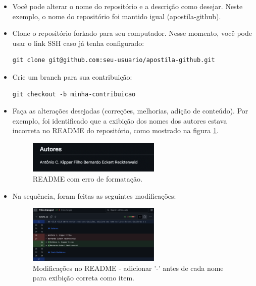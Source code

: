 \begin{itemize}
        \item Você pode alterar o nome do repositório e a descrição como desejar. Neste exemplo, o nome do repositório foi mantido igual (apostila-github).
        \item Clone o repositório forkado para seu computador. Nesse momento, você pode usar o link SSH caso já tenha configurado:
        \begin{lstlisting}[style=shellstyle]
git clone git@github.com:seu-usuario/apostila-github.git
        \end{lstlisting}
        \item Crie um branch para sua contribuição:
        \begin{lstlisting}[style=shellstyle]
git checkout -b minha-contribuicao
        \end{lstlisting}
        \item Faça as alterações desejadas (correções, melhorias, adição de conteúdo). Por exemplo, foi identificado que a exibição dos nomes dos autores estava incorreta no README do repositório, como mostrado na figura \ref{fig:README_antes_modif}.

        \begin{figure}[H]
        \centering
        \includegraphics[width=0.6\textwidth]{imgs/tutorial_contribuicao/README_antes_modif.png}
        \caption{README com erro de formatação.}
        \label{fig:README_antes_modif}
    \end{figure}

        \item Na sequência, foram feitas as seguintes modificações:

        \begin{figure}[H]
        \centering
        \includegraphics[width=0.6\textwidth]{imgs/tutorial_contribuicao/README_modif.png}
        \caption{Modificações no README - adicionar '-' antes de cada nome para exibição correta como item.}
        \label{fig:README_modif}
    \end{figure}


\end{itemize}
